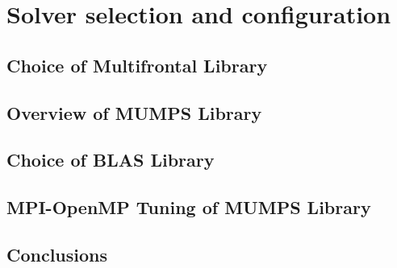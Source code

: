 \chapter{Solver selection and configuration}
\label{chapter:solver configuration}


















\section{Choice of Multifrontal Library}
\label{subseq:multifrontal method}



\section{Overview of MUMPS Library}
\label{subseq:multifrontal-method}





\section{Choice of BLAS Library}
\label{subseq:blas-comparison}



\section{MPI-OpenMP Tuning of MUMPS Library}
\label{subseq:mpi-openmp}


\section{Conclusions}
\label{subseq:conclusions}




